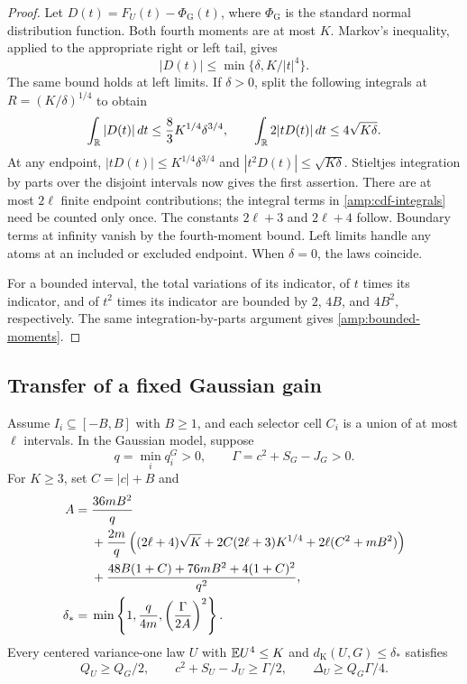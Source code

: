 \begin{proof}
Let $D(t)=F_U(t)-\Phi_{\mathrm G}(t)$, where $\Phi_{\mathrm G}$ is
the standard normal distribution function. Both fourth moments are at most $K$.
Markov's inequality, applied to the appropriate right or left tail, gives
\[
 |D(t)|\le\min\{\delta,K/|t|^4\}.
\]
The same bound holds at left limits.  If $\delta>0$, split the following
integrals at $R=(K/\delta)^{1/4}$ to obtain
\begin{equation}
 \int_{\mathbb R}|D(t)|\,dt\le\frac83K^{1/4}\delta^{3/4},\qquad
 \int_{\mathbb R}2|tD(t)|\,dt\le4\sqrt{K\delta}.
 \label{amp:cdf-integrals}
\end{equation}
At any endpoint, $|tD(t)|\le K^{1/4}\delta^{3/4}$ and
$|t^2D(t)|\le\sqrt{K\delta}$.  Stieltjes integration by parts over
the disjoint intervals now gives the first assertion.  There are at most
$2\ell$ finite endpoint contributions; the integral terms in
\eqref{amp:cdf-integrals} need be counted only once.  The constants
$2\ell+3$ and $2\ell+4$ follow.  Boundary terms at infinity vanish
by the fourth-moment bound.  Left limits handle any atoms at an included
or excluded endpoint.  When $\delta=0$, the laws coincide.

For a bounded interval, the total variations of its indicator, of $t$
times its indicator, and of $t^2$ times its indicator are bounded by
$2$, $4B$, and $4B^2$, respectively.  The same integration-by-parts
argument gives \eqref{amp:bounded-moments}.
\end{proof}

\subsection{Transfer of a fixed Gaussian gain}

\begin{theorem}
\label{amp:transfer}
Assume $I_i\subseteq[-B,B]$ with $B\ge1$, and each selector cell $C_i$
is a union of at most $\ell$ intervals.  In the Gaussian model, suppose
\[
 q=\min_i q_i^G>0,\qquad
 \Gamma=c^2+S_G-J_G>0.
\]
For $K\ge3$, set $C=|c|+B$ and
\begin{align}
 A={}&\frac{36mB^2}{q}\notag\\
 &+\frac{2m}{q}\left((2\ell+4)\sqrt K
      +2C(2\ell+3)K^{1/4}+2\ell(C^2+mB^2)\right)\notag\\
 &+\frac{48B(1+C)+76mB^2+4(1+C)^2}{q^2},
 \label{amp:A}\\
 \delta_*={}&\min\left\{1,\frac{q}{4m},
                           \left(\frac{\Gamma}{2A}\right)^2\right\}.
 \label{amp:delta-star}
\end{align}
Every centered variance-one law $U$ with $\mathbb E U^4\le K$ and
$d_{\mathrm K}(U,G)\le\delta_*$ satisfies
\begin{equation}
 Q_U\ge Q_G/2,\qquad c^2+S_U-J_U\ge\Gamma/2,\qquad
 \Delta_U\ge Q_G\Gamma/4.
 \label{amp:transfer-conclusion}
\end{equation}
\end{theorem}

